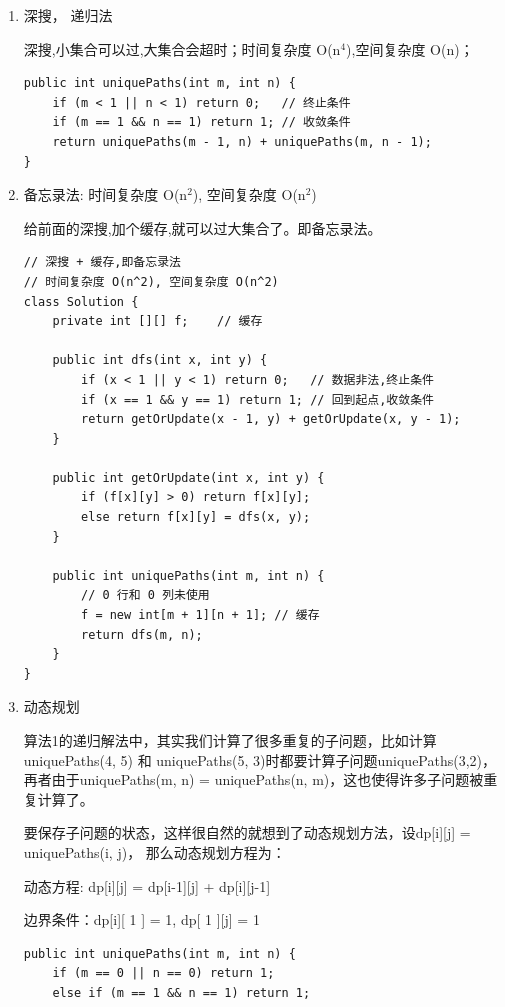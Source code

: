 \documentclass[12pt]{book}
\begin{document}
\begin{enumerate}
\item 深搜， 递归法
\label{sec-14-2-1-1}

深搜,小集合可以过,大集合会超时；时间复杂度 O(n$^{\text{4}}$),空间复杂度 O(n)；
\lstset{language=java,label= ,caption= ,numbers=none}
\begin{lstlisting}
public int uniquePaths(int m, int n) {
    if (m < 1 || n < 1) return 0;   // 终止条件
    if (m == 1 && n == 1) return 1; // 收敛条件
    return uniquePaths(m - 1, n) + uniquePaths(m, n - 1);
}
\end{lstlisting}
\item 备忘录法: 时间复杂度 O(n$^{\text{2}}$), 空间复杂度 O(n$^{\text{2}}$)
\label{sec-14-2-1-2}

给前面的深搜,加个缓存,就可以过大集合了。即备忘录法。
\lstset{language=java,label= ,caption= ,numbers=none}
\begin{lstlisting}
// 深搜 + 缓存,即备忘录法
// 时间复杂度 O(n^2), 空间复杂度 O(n^2)
class Solution {
    private int [][] f;    // 缓存
        
    public int dfs(int x, int y) {
        if (x < 1 || y < 1) return 0;   // 数据非法,终止条件
        if (x == 1 && y == 1) return 1; // 回到起点,收敛条件
        return getOrUpdate(x - 1, y) + getOrUpdate(x, y - 1);
    }
    
    public int getOrUpdate(int x, int y) {
        if (f[x][y] > 0) return f[x][y];
        else return f[x][y] = dfs(x, y);
    }
    
    public int uniquePaths(int m, int n) {        
        // 0 行和 0 列未使用
        f = new int[m + 1][n + 1]; // 缓存
        return dfs(m, n);
    }
}
\end{lstlisting}
\item 动态规划
\label{sec-14-2-1-3}

算法1的递归解法中，其实我们计算了很多重复的子问题，比如计算uniquePaths(4, 5) 和 uniquePaths(5, 3)时都要计算子问题uniquePaths(3,2)，再者由于uniquePaths(m, n) = uniquePaths(n, m)，这也使得许多子问题被重复计算了。

要保存子问题的状态，这样很自然的就想到了动态规划方法，设dp[i][j] = uniquePaths(i, j)， 那么动态规划方程为：

动态方程: dp[i][j] = dp[i-1][j] + dp[i][j-1]

边界条件：dp[i][ 1 ] = 1, dp[ 1 ][j] = 1
\lstset{language=java,label= ,caption= ,numbers=none}
\begin{lstlisting}
public int uniquePaths(int m, int n) {
    if (m == 0 || n == 0) return 1;
    else if (m == 1 && n == 1) return 1;
            

\end{lstlisting}
\end{enumerate}
\end{document}
